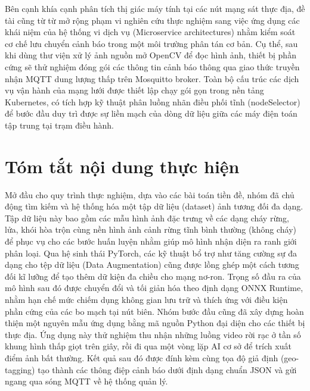 \documentclass[12pt,a4paper]{report}
\begin{document}
Bên cạnh khía cạnh phân tích thị giác máy tính tại các nút mạng sát thực địa, đề tài cũng từ từ mở rộng phạm vi nghiên cứu thực nghiệm sang việc ứng dụng các khái niệm của hệ thống vi dịch vụ (Microservice architectures) nhằm kiểm soát cơ chế lưu chuyển cảnh báo trong một môi trường phân tán cơ bản. Cụ thể, sau khi dùng thư viện xử lý ảnh nguồn mở OpenCV \cite{opencv} để đọc hình ảnh, thiết bị phần cứng sẽ thử nghiệm đóng gói các thông tin cảnh báo thông qua giao thức truyền nhận MQTT dung lượng thấp trên Mosquitto broker. Toàn bộ cấu trúc các dịch vụ vận hành của mạng lưới được thiết lập chạy gói gọn trong nền tảng Kubernetes, có tích hợp kỹ thuật phân luồng nhãn điều phối tĩnh (nodeSelector) để bước đầu duy trì được sự liền mạch của dòng dữ liệu giữa các máy điện toán tập trung tại trạm điều hành.

\section{Tóm tắt nội dung thực hiện}

Mở đầu cho quy trình thực nghiệm, dựa vào các bài toán tiền đề, nhóm đã chủ động tìm kiếm và hệ thống hóa một tập dữ liệu (dataset) ảnh tương đối đa dạng. Tập dữ liệu này bao gồm các mẫu hình ảnh đặc trưng về các dạng cháy rừng, lửa, khói hòa trộn cùng nền hình ảnh cảnh rừng tĩnh bình thường (không cháy) để phục vụ cho các bước huấn luyện nhằm giúp mô hình nhận diện ra ranh giới phân loại. Qua hệ sinh thái PyTorch, các kỹ thuật bổ trợ như tăng cường sự đa dạng cho tệp dữ liệu (Data Augmentation) cũng được lồng ghép một cách tương đối kĩ lưỡng để tạo thêm dữ kiện đa chiều cho mạng nơ-ron. Trọng số đầu ra của mô hình sau đó được chuyển đổi và tối giản hóa theo định dạng ONNX Runtime, nhằm hạn chế mức chiếm dụng không gian lưu trữ và thích ứng với điều kiện phần cứng của các bo mạch tại nút biên. Nhóm bước đầu cũng đã xây dựng hoàn thiện một nguyên mẫu ứng dụng bằng mã nguồn Python đại diện cho các thiết bị thực địa. Ứng dụng này thử nghiệm thu nhận những luồng video rời rạc ở tần số khung hình thấp giọt trên giây, rồi đi qua một vòng lặp AI cơ sở để trích xuất điểm ảnh bất thường. Kết quả sau đó được đính kèm cùng tọa độ giả định (geo-tagging) tạo thành các thông điệp cảnh báo dưới định dạng chuẩn JSON và gửi ngang qua sóng MQTT về hệ thống quản lý.
\end{document}
